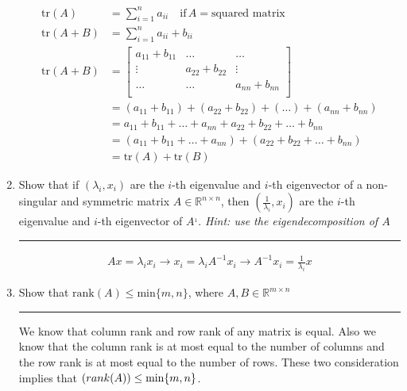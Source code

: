 \documentclass[12pt]{article}
\begin{document}
\begin{enumerate}
    \begin{align*}
        \textrm{tr}(A) &= \sum_{i=1}^{n} a_{ii} \quad \textrm{if} \, A = \textrm{squared matrix} \\
        \textrm{tr}(A + B) &= \sum_{i=1}^{n} a_{ii} + b_{ii}\\
        \textrm{tr}(A + B) &= 
        \begin{bmatrix}
            a_{11} + b_{11}  &   \dots            &   \dots            \\
            \vdots           &   a_{22} + b_{22}  &   \vdots           \\  
            \dots            &   \dots            &   a_{nn} + b_{nn}  \\
        \end{bmatrix} \\
         &= ( a_{11} + b_{11}  ) + ( a_{22} + b_{22} ) + ( \dots ) + ( a_{nn} + b_{nn}  ) \\
         &= a_{11} + b_{11} + \dots +  a_{nn}  +  a_{22} + b_{22}  +  \dots   + b_{nn}   \\
         &= ( a_{11} + b_{11} + \dots +  a_{nn} ) + ( a_{22} + b_{22}  +  \dots   + b_{nn} )   \\
         &= \textrm{tr}(A) + \textrm{tr}(B)
    \end{align*}   

    \item Show that if $(\lambda_i, x_i)$ are the $i$-th eigenvalue and $i$-th eigenvector of a non-singular and symmetric matrix 
          $A \in \mathbb{R}^{n \times n}$, then $( \frac{1}{\lambda_i}, x_i)$ are the $i$-th eigenvalue and $i$-th eigenvector of $A^{_1}$.
          \textit{Hint: use the eigendecomposition of $A$}
    
    \noindent\rule{\linewidth}{1pt}

    \begin{align*}
        Ax = \lambda_i x_i \rightarrow x_i = \lambda_i A^{-1} x_i \rightarrow A^{-1} x_i = \frac{1}{\lambda_i} x
    \end{align*}

    \item Show that $\textrm{rank}(A) \leq \textrm{min}\{m, n\}$, where $A, B \in \mathbb{R}^{m \times n}$
    
    \noindent\rule{\linewidth}{1pt}

    We know that column rank and row rank of any matrix is equal. Also we know that the column rank is at most
    equal to the number of columns and the row rank is at most equal to the number of rows. These two consideration implies
    that $\textrm(rank(A)) \leq \textrm{min}\{m, n\}$.   


\end{enumerate}
\end{document}
